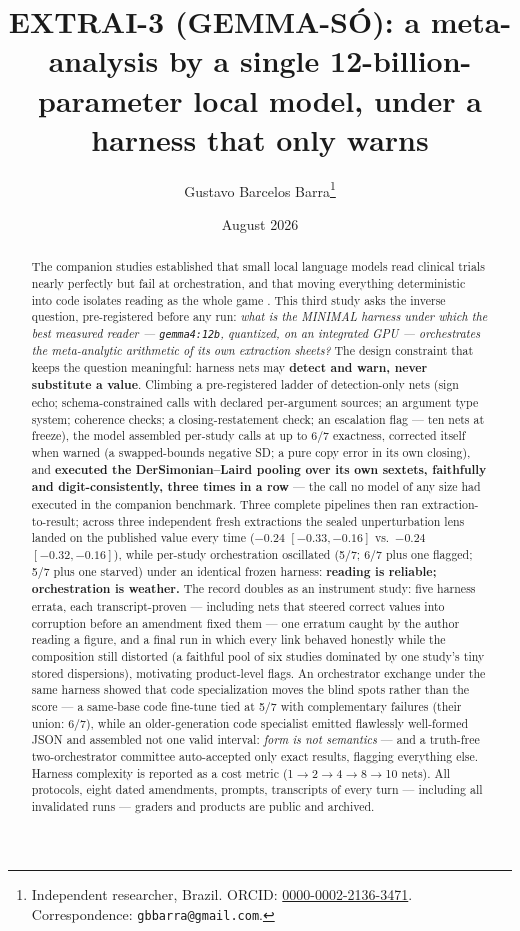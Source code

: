 \documentclass[11pt]{article}
\title{\textbf{EXTRAI-3 (GEMMA-S\'O): a meta-analysis by a single 12-billion-parameter local model, under a harness that only warns}}
\author{Gustavo Barcelos Barra\thanks{Independent researcher, Brazil. ORCID: \href{https://orcid.org/0000-0002-2136-3471}{0000-0002-2136-3471}. Correspondence: \texttt{gbbarra@gmail.com}.}}
\date{August 2026}
\begin{document}
\maketitle

\begin{abstract}
\noindent The companion studies established that small local language models read clinical trials nearly perfectly but fail at orchestration, and that moving everything deterministic into code isolates reading as the whole game \citep{barra2026companion,barra2026extrai2}. This third study asks the inverse question, pre-registered before any run: \emph{what is the MINIMAL harness under which the best measured reader --- \texttt{gemma4:12b}, quantized, on an integrated GPU --- orchestrates the meta-analytic arithmetic of its own extraction sheets?} The design constraint that keeps the question meaningful: harness nets may \textbf{detect and warn, never substitute a value}. Climbing a pre-registered ladder of detection-only nets (sign echo; schema-constrained calls with declared per-argument sources; an argument type system; coherence checks; a closing-restatement check; an escalation flag --- ten nets at freeze), the model assembled per-study calls at up to 6/7 exactness, corrected itself when warned (a swapped-bounds negative SD; a pure copy error in its own closing), and \textbf{executed the DerSimonian--Laird pooling over its own sextets, faithfully and digit-consistently, three times in a row} --- the call no model of any size had executed in the companion benchmark. Three complete pipelines then ran extraction-to-result; across three independent fresh extractions the sealed unperturbation lens landed on the published value every time ($-0.24$ $[-0.33, -0.16]$ vs.\ $-0.24$ $[-0.32, -0.16]$), while per-study orchestration oscillated (5/7; 6/7 plus one flagged; 5/7 plus one starved) under an identical frozen harness: \textbf{reading is reliable; orchestration is weather.} The record doubles as an instrument study: five harness errata, each transcript-proven --- including nets that steered correct values into corruption before an amendment fixed them --- one erratum caught by the author reading a figure, and a final run in which every link behaved honestly while the composition still distorted (a faithful pool of six studies dominated by one study's tiny stored dispersions), motivating product-level flags. An orchestrator exchange under the same harness showed that code specialization moves the blind spots rather than the score --- a same-base code fine-tune tied at 5/7 with complementary failures (their union: 6/7), while an older-generation code specialist emitted flawlessly well-formed JSON and assembled not one valid interval: \emph{form is not semantics} --- and a truth-free two-orchestrator committee auto-accepted only exact results, flagging everything else. Harness complexity is reported as a cost metric (1$\to$2$\to$4$\to$8$\to$10 nets). All protocols, eight dated amendments, prompts, transcripts of every turn --- including all invalidated runs --- graders and products are public and archived.
\end{abstract}
\end{document}
